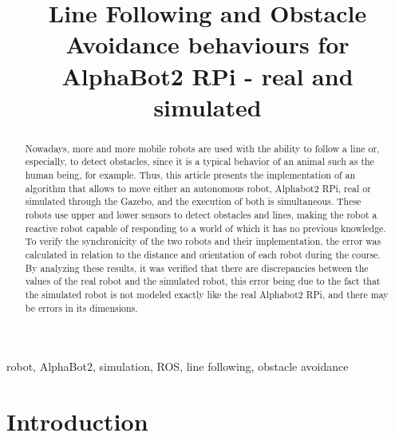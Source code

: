\documentclass[conference]{IEEEtran}
\begin{document}
\title{Line Following and Obstacle Avoidance behaviours for AlphaBot2 RPi - real and simulated}

\author{
\and
{}
}

\maketitle

\begin{abstract}
Nowadays, more and more mobile robots are used with the ability to follow a line or, especially, to detect obstacles, since it is a typical behavior of an animal such as the human being, for example. Thus, this article presents the implementation of an algorithm that allows to move either an autonomous robot, Alphabot2 RPi, real or simulated through the Gazebo, and the execution of both is simultaneous. These robots use upper and lower sensors to detect obstacles and lines, making the robot a reactive robot capable of responding to a world of which it has no previous knowledge. To verify the synchronicity of the two robots and their implementation, the error was calculated in relation to the distance and orientation of each robot during the course. By analyzing these results, it was verified that there are discrepancies between the values ​​of the real robot and the simulated robot, this error being due to the fact that the simulated robot is not modeled exactly like the real Alphabot2 RPi, and there may be errors in its dimensions.
\end{abstract}

\begin{IEEEkeywords}
robot, AlphaBot2, simulation, ROS, line following, obstacle avoidance
\end{IEEEkeywords}

\section{Introduction} \label{intro}
\end{document}

